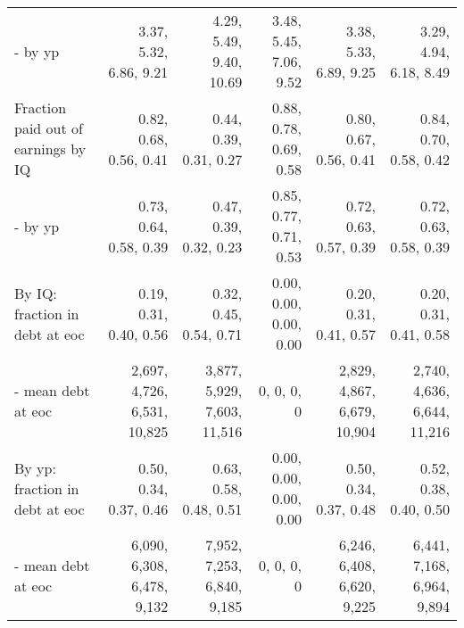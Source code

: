 \begin{tabular}{lrrrrr}
- by yp & 3.37, 5.32, 6.86, 9.21  & 4.29, 5.49, 9.40, 10.69  & 3.48, 5.45, 7.06, 9.52  & 3.38, 5.33, 6.89, 9.25  & 3.29, 4.94, 6.18, 8.49  \\ 
Fraction paid out of earnings by IQ & 0.82, 0.68, 0.56, 0.41  & 0.44, 0.39, 0.31, 0.27  & 0.88, 0.78, 0.69, 0.58  & 0.80, 0.67, 0.56, 0.41  & 0.84, 0.70, 0.58, 0.42  \\ 
- by yp & 0.73, 0.64, 0.58, 0.39  & 0.47, 0.39, 0.32, 0.23  & 0.85, 0.77, 0.71, 0.53  & 0.72, 0.63, 0.57, 0.39  & 0.72, 0.63, 0.58, 0.39  \\ 
By IQ: fraction in debt at eoc & 0.19, 0.31, 0.40, 0.56  & 0.32, 0.45, 0.54, 0.71  & 0.00, 0.00, 0.00, 0.00  & 0.20, 0.31, 0.41, 0.57  & 0.20, 0.31, 0.41, 0.58  \\ 
- mean debt at eoc & 2,697, 4,726, 6,531, 10,825  & 3,877, 5,929, 7,603, 11,516  & 0, 0, 0, 0  & 2,829, 4,867, 6,679, 10,904  & 2,740, 4,636, 6,644, 11,216  \\ 
By yp: fraction in debt at eoc & 0.50, 0.34, 0.37, 0.46  & 0.63, 0.58, 0.48, 0.51  & 0.00, 0.00, 0.00, 0.00  & 0.50, 0.34, 0.37, 0.48  & 0.52, 0.38, 0.40, 0.50  \\ 
- mean debt at eoc & 6,090, 6,308, 6,478, 9,132  & 7,952, 7,253, 6,840, 9,185  & 0, 0, 0, 0  & 6,246, 6,408, 6,620, 9,225  & 6,441, 7,168, 6,964, 9,894  \\ 
\hline
\end{tabular}%
